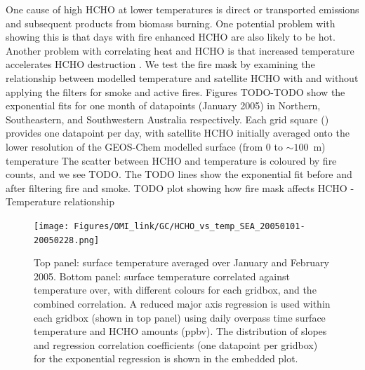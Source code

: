       
      
      
      One cause of high HCHO at lower temperatures is direct or transported emissions and subsequent products from biomass burning.
      One potential problem with showing this is that days with fire enhanced HCHO are also likely to be hot.
      Another problem with correlating heat and HCHO is that increased temperature accelerates HCHO destruction \parencite{Zheng2015}.
      We test the fire mask by examining the relationship between modelled temperature and satellite HCHO with and without applying the filters for smoke and active fires.
      Figures TODO-TODO show the exponential fits for one month of datapoints (January 2005) in Northern, Southeastern, and Southwestern Australia respectively.
      Each grid square (\lowhr) provides one datapoint per day, with satellite HCHO initially averaged onto the lower resolution of the GEOS-Chem modelled surface (from 0 to $\sim 100$~m) temperature
      The scatter between HCHO and temperature is coloured by fire counts, and we see TODO.
      The TODO lines show the exponential fit before and after filtering fire and smoke.
      TODO plot showing how fire mask affects HCHO - Temperature relationship
      
      
      \begin{figure}
        \texttt{[image: Figures/OMI\_link/GC/HCHO\_vs\_temp\_SEA\_20050101-20050228.png]}
        \caption{%
          Top panel: surface temperature averaged over January and February 2005.
          Bottom panel: surface temperature correlated against temperature over, with different colours for each gridbox, and the combined correlation. 
          A reduced major axis regression is used within each gridbox (shown in top panel) using daily overpass time surface temperature and HCHO amounts (ppbv).
          The distribution of slopes and regression correlation coefficients (one datapoint per gridbox) for the exponential regression is shown in the embedded plot.
          }
        \label{Model:analysis:HCHO:fig_hcho_vs_temp_SEA_200501}
        \end{figure}
          
